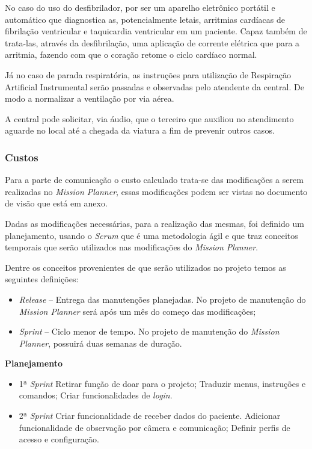 No caso do uso do desfibrilador, por ser um aparelho eletrônico portátil e automático que diagnostica as, potencialmente letais, arritmias cardíacas de fibrilação ventricular e taquicardia ventricular em um paciente. Capaz também de trata-las, através da desfibrilação, uma aplicação de corrente elétrica que para a arritmia, fazendo com que o coração retome o ciclo cardíaco normal.

Já no caso de parada respiratória, as instruções para utilização de Respiração Artificial Instrumental serão passadas e observadas pelo atendente da central. De modo a normalizar a ventilação por via aérea.

A central pode solicitar, via áudio, que o terceiro que auxiliou no atendimento aguarde no local até a chegada da viatura a fim de prevenir outros casos.

\subsubsection{Custos}
  
  Para a parte de comunicação o custo calculado trata-se das modificações a serem realizadas no
  \textit{Mission Planner}, essas modificações podem ser vistas no documento de visão que está
  em anexo.
  
  Dadas as modificações necessárias, para a realização das mesmas, foi definido um planejamento, usando o \textit{Scrum} que
  é uma metodologia ágil e que traz conceitos temporais que serão utilizados nas modificações do \textit{Mission Planner}. 
  
  Dentre os conceitos provenientes de  que serão utilizados no projeto temos as seguintes definições:

  \begin{itemize}
  \item \textit{Release} – Entrega das manutenções planejadas. No projeto de manutenção do \textit{Mission Planner} será após um mês do começo das modificações;
  \item \textit{Sprint} – Ciclo menor de tempo. No projeto de manutenção do \textit{Mission Planner}, possuirá duas semanas de duração.
  \end{itemize}

  \textbf{Planejamento}
   \begin{itemize}
      \item 1ª \textit{Sprint}
	\subitem Retirar função de doar para o projeto;
	\subitem Traduzir menus, instruções e comandos;
	\subitem Criar funcionalidades de \textit{login}.	
      \item 2ª \textit{Sprint}
      \subitem Criar funcionalidade de receber dados do paciente.
      \subitem Adicionar funcionalidade de observação por câmera e comunicação;
      \subitem Definir perfis de acesso e configuração.
  \end{itemize}

